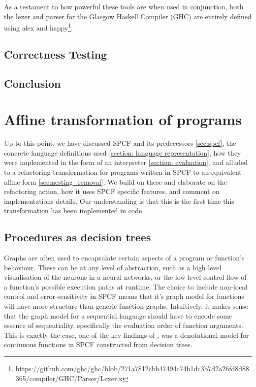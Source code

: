 \documentclass[12pt,a4paper]{report}
\theoremstyle{definition}
\theoremstyle{remark}
\begin{document}
As a testament to how powerful these tools are when used in conjunction, both the lexer and parser for the Glasgow Haskell Compiler (GHC) are entirely defined using alex and happy\footnote{https://github.com/ghc/ghc/blob/271a7812cbb47494c74b1dc3b7d2a26fd8d88365/compiler/GHC/Parser/Lexer.x}. 

\section{Correctness Testing}
\section{Conclusion}

\chapter{Affine transformation of programs}\label{chapter: denesting}
Up to this point, we have discussed SPCF and its predecessors \ref{sec:spcf}, the concrete language definitions used \ref{section: language representation}, how they were implemented in the form of an interpreter \ref{section: evaluation}, and alluded to a refactoring transformation for programs written in SPCF to an equivalent affine form \ref{sec:nesting_removal}. We build on these and elaborate on the refactoring action, how it uses SPCF specific features, and comment on implementations details. Our understanding is that this is the first time this transformation has been implemented in code. 

\section{Procedures as decision trees}
Graphs are often used to encapsulate certain aspects of a program or function's behaviour. These can be at any level of abstraction, such as a high level visualisation of the neurons in a neural networks, or the low level control flow of a function's possible execution paths at runtime. The choice to include non-local control and error-sensitivity in SPCF means that it's graph model for functions will have more structure than generic function graphs. Intuitively, it makes sense that the graph model for a sequential language should have to encode some essence of sequentiality, specifically the evaluation order of function arguments. This is exactly the case, one of the key findings of \cite{cartwright_1992}, was a denotational model for continuous functions in SPCF constructed from decision trees. 
\end{document}
